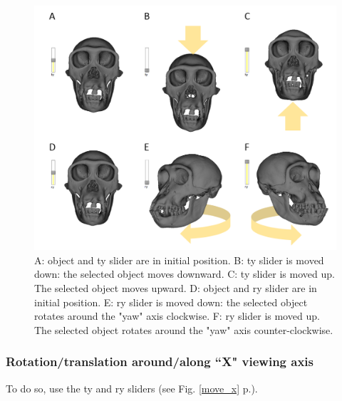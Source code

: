 \begin{figure}
  \centering
  \includegraphics[scale=0.45]{images/06/objects/move_objects_y.png} 
	\caption{A: object and ty slider are in initial position. B: ty slider is moved down: the selected object moves downward. C: ty slider is moved up. The selected object moves upward. D: object and ry slider are in initial position. E: ry slider is moved down: the selected object rotates around the "yaw" axis clockwise. F: ry slider is moved up. The selected object rotates around the "yaw" axis counter-clockwise.}
\label{move_y}
 
\end{figure}



\subsubsection{Rotation/translation around/along ``X" viewing axis}

To do so, use the ty and ry sliders (see Fig. \ref{move_x} p.\pageref{move_x}).

